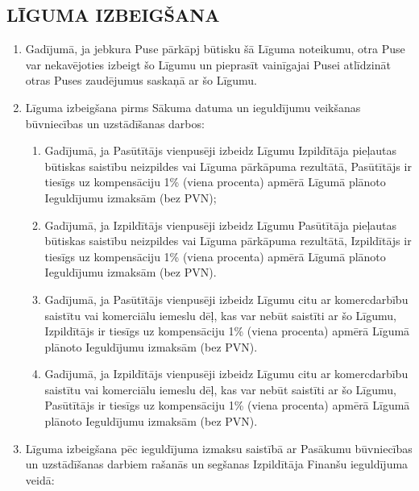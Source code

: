 \begin{multicols}{2}
\subsection{LĪGUMA IZBEIGŠANA}
\begin{enumerate}
	\item Gadījumā, ja jebkura Puse pārkāpj būtisku šā Līguma noteikumu, otra Puse var nekavējoties izbeigt šo Līgumu un pieprasīt vainīgajai Pusei atlīdzināt otras Puses zaudējumus saskaņā ar šo Līgumu.
	\item Līguma izbeigšana pirms Sākuma datuma un ieguldījumu veikšanas būvniecības un uzstādīšanas darbos:
	\begin{enumerate}
		\item Gadījumā, ja Pasūtītājs vienpusēji izbeidz Līgumu Izpildītāja pieļautas būtiskas saistību neizpildes vai Līguma pārkāpuma rezultātā, Pasūtītājs ir tiesīgs uz kompensāciju 1\% (viena procenta) apmērā Līgumā plānoto Ieguldījumu izmaksām (bez PVN);
		\item Gadījumā, ja Izpildītājs vienpusēji izbeidz Līgumu Pasūtītāja pieļautas būtiskas saistību neizpildes vai Līguma pārkāpuma rezultātā, Izpildītājs ir tiesīgs uz kompensāciju 1\% (viena procenta) apmērā Līgumā plānoto Ieguldījumu izmaksām (bez PVN).
		\item Gadījumā, ja Pasūtītājs vienpusēji izbeidz Līgumu citu ar komercdarbību saistītu vai komerciālu iemeslu dēļ, kas var nebūt saistīti ar šo Līgumu, Izpildītājs ir tiesīgs uz kompensāciju 1\% (viena procenta) apmērā Līgumā plānoto Ieguldījumu izmaksām (bez PVN).
		\item Gadījumā, ja Izpildītājs vienpusēji izbeidz Līgumu citu ar komercdarbību saistītu vai komerciālu iemeslu dēļ, kas var nebūt saistīti ar šo Līgumu, Pasūtītājs ir tiesīgs uz kompensāciju 1\% (viena procenta) apmērā Līgumā plānoto Ieguldījumu izmaksām (bez PVN).
	\end{enumerate}
	\item Līguma izbeigšana pēc ieguldījuma izmaksu saistībā ar Pasākumu būvniecības un uzstādīšanas darbiem rašanās un segšanas Izpildītāja Finanšu ieguldījuma veidā:
	\begin{enumerate}

\end{enumerate}
\end{enumerate}
\end{multicols}
